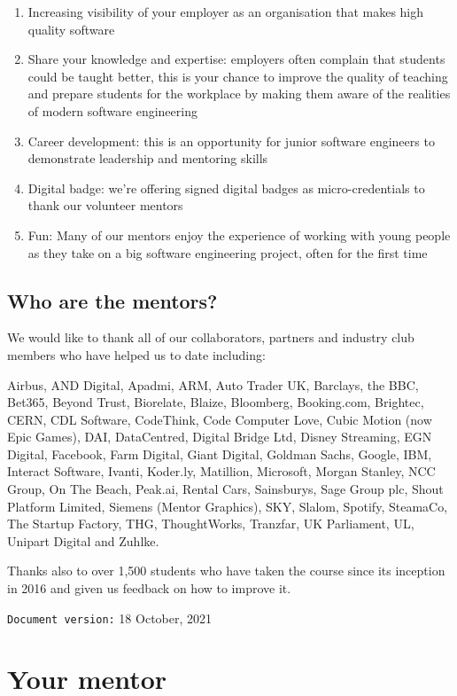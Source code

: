 \documentclass[
]{book}
\providecommand{\tightlist}{%
  \setlength{\itemsep}{0pt}\setlength{\parskip}{0pt}}
\begin{document}
\begin{enumerate}
\def\labelenumi{\arabic{enumi}.}
\tightlist
\item
  Increasing visibility of your employer as an organisation that makes high quality software
\item
  Share your knowledge and expertise: employers often complain that students could be taught better, this is your chance to improve the quality of teaching and prepare students for the workplace by making them aware of the realities of modern software engineering
\item
  Career development: this is an opportunity for junior software engineers to demonstrate leadership and mentoring skills
\item
  Digital badge: we're offering signed digital badges as micro-credentials to thank our volunteer mentors
\item
  Fun: Many of our mentors enjoy the experience of working with young people as they take on a big software engineering project, often for the first time
\end{enumerate}

\hypertarget{thanks}{%
\section{Who are the mentors?}\label{thanks}}

We would like to thank all of our collaborators, partners and industry club members who have helped us to date including:

Airbus, AND Digital, Apadmi, ARM, Auto Trader UK, Barclays, the BBC, Bet365, Beyond Trust, Biorelate, Blaize, Bloomberg, Booking.com, Brightec, CERN, CDL Software, CodeThink, Code Computer Love, Cubic Motion (now Epic Games), DAI, DataCentred, Digital Bridge Ltd, Disney Streaming, EGN Digital, Facebook, Farm Digital, Giant Digital, Goldman Sachs, Google, IBM, Interact Software, Ivanti, Koder.ly, Matillion, Microsoft, Morgan Stanley, NCC Group, On The Beach, Peak.ai, Rental Cars, Sainsburys, Sage Group plc, Shout Platform Limited, Siemens (Mentor Graphics), SKY, Slalom, Spotify, SteamaCo, The Startup Factory, THG, ThoughtWorks, Tranzfar, UK Parliament, UL, Unipart Digital and Zuhlke.

Thanks also to over 1,500 students who have taken the course since its inception in 2016 and given us feedback on how to improve it.

\texttt{Document\ version:} 18 October, 2021

\hypertarget{ourmentor}{%
\chapter{Your mentor}\label{ourmentor}}
\end{document}
